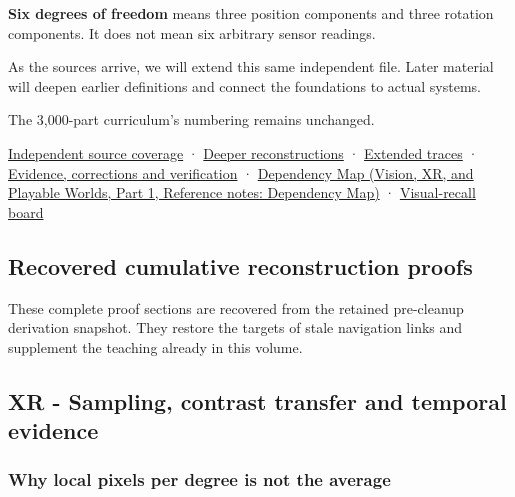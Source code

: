\textbf{Six degrees of freedom} means three position components and three rotation components. It does not mean six arbitrary sensor readings.

As the sources arrive, we will extend this same independent file. Later material will deepen earlier definitions and connect the foundations to actual systems.

The 3,000-part curriculum's numbering remains unchanged.

\hyperref[appendix-fd090d982a15-xr01---independent-seeing-and-representation-source]{Independent source coverage} · \hyperref[04-visual-computing-ii-ch042-xr---sampling-contrast-transfer-and-temporal-evidence]{Deeper reconstructions} · \hyperref[appendix-92ff77d4dfdc-xr---from-geometry-to-sample-loss-and-evidence]{Extended traces} · \hyperref[appendix-a103e7846d21-xr01---seeing-and-representing-reality]{Evidence, corrections and verification} · \href{../07-Vision-XR-and-Playable-Worlds-P01/main.pdf\#nameddest=appendix-4ad47bdd269a}{Dependency Map (Vision, XR, and Playable Worlds, Part 1, Reference notes: Dependency Map)} · \hyperref[appendix-73c6b8ed5a87]{Visual-recall board}

\subsection{Recovered cumulative reconstruction proofs}\label{04-visual-computing-ii-ch043-recovered-cumulative-reconstruction-proofs}

\hypertarget{04-visual-computing-ii-ch043-recovered-cumulative-reconstruction-proofs}{}

These complete proof sections are recovered from the retained pre-cleanup derivation snapshot. They restore the targets of stale navigation links and supplement the teaching already in this volume.

\subsection{XR - Sampling, contrast transfer and temporal evidence}\label{04-visual-computing-ii-ch043-xr---sampling-contrast-transfer-and-temporal-evidence}

\hypertarget{04-visual-computing-ii-ch043-xr---sampling-contrast-transfer-and-temporal-evidence}{}

\subsubsection{Why local pixels per degree is not the average}\label{04-visual-computing-ii-ch043-why-local-pixels-per-degree-is-not-the-average}

